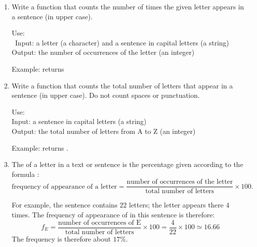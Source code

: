 \documentclass[11pt,class=report,crop=false]{standalone}
\begin{document}
\begin{activite}


\begin{enumerate}
  \item Write a function  that counts the number of times the given letter appears in a sentence (in upper case).
  
    \begin{fonction}
   Use: \\\
   Input: a letter (a character) and a sentence in capital letters (a string)\\
   Output: the number of occurrences of the letter (an integer)
  
  \medskip
     
   Example:  returns 
  \end{fonction}
  
 \item Write a function  that counts the total number of letters that appear in a sentence (in upper case). Do not count spaces or punctuation.
 
     \begin{fonction}
   Use: \\
   Input: a sentence in capital letters (a string)\\
   Output: the total number of letters from \og{}A\fg{} to \og{}Z\fg{} (an integer)
  
  \medskip
     
   Example:  returns .
  \end{fonction}
 
 \item The  of a letter in a text or sentence is the percentage given according to the formula :
 $$\text{frequency of appearance of a letter} = \frac{\text{number of occurrences of the letter}}{\text{total number of letters}} \times 100.$$
 
 \medskip
 
 For example, the sentence  contains $22$ letters; 
  the letter  appears there $4$ times. The frequency of appearance of \mot{E} in this sentence is therefore:
  $$f_E = \frac{\text{number of occurrences of E}}{\text{total number of letters}} \times 100  = \frac{4}{22} \times  100 \simeq 16.66$$
 The frequency is therefore about $17\%$.
  

\end{enumerate}
\end{activite}
\end{document}
